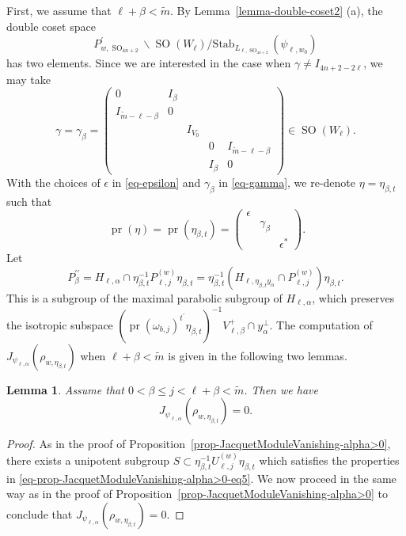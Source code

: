 \documentclass[12pt]{amsart}
\newcommand{\wt}{\widetilde}
\newtheorem{lemma}[theorem]{Lemma}
\theoremstyle{remark}
\newcommand{\pr}{\operatorname{pr}}
\DeclareMathOperator{\SO}{SO}
\begin{document}
First, we assume that $\ell+\beta<\wt m$. By Lemma~\ref{lemma-double-coset2} (a), the double coset space $$P_{w,\SO_{4n+2}}^\prime\backslash \SO(W_{\ell}) / \mathrm{Stab}_{L_{\ell,\SO_{4n+2}}}(\psi_{\ell, w_0})$$ 
has two elements. Since we are interested in the case when $\gamma\not=I_{4n+2-2\ell}$, we may take
\begin{equation}
\label{eq-gamma}
\gamma=\gamma_\beta= \begin{pmatrix}
 0 & I_{\beta} & & &\\
 I_{\wt m -\ell-\beta} & 0 & & &\\
 &&I_{V_0} &&\\
 &&&0&I_{\wt m-\ell-\beta} \\
 &&&I_{\beta} & 0
 \end{pmatrix}\in \SO(W_{\ell}).
\end{equation}
With the choices of $\epsilon$ in \eqref{eq-epsilon} and $\gamma_\beta$ in \eqref{eq-gamma}, we re-denote $\eta=\eta_{\beta, t}$ such that 
\begin{equation*}\
\pr(\eta)=\pr(\eta_{\beta, t})=  \begin{pmatrix}
 \epsilon & & \\ & \gamma_\beta &\\ && \epsilon^*	
 \end{pmatrix}.	
\end{equation*}
Let
\begin{equation}
\label{eq-P-double-prime}
P_{\beta}^{\prime\prime} = H_{\ell,\alpha}\cap \eta_{\beta, t}^{-1} P_{\ell,j}^{(w)}\eta_{\beta,t} = \eta_{\beta, t}^{-1} (H_{\ell, \eta_{\beta, t}y_{\alpha}} \cap P_{\ell,j}^{(w)} ) \eta_{\beta, t}.
\end{equation}
This is a subgroup of the maximal parabolic subgroup of $H_{\ell,\alpha}$, which preserves the isotropic subspace $(\pr(\omega_{b,j})^{t^\prime} \eta_{\beta, t})^{-1} V_{\ell, \beta}^+\cap y_{\alpha}^\perp$. The computation of $J_{\psi_{\ell,\alpha}}(	\rho_{w,\eta_{\beta,t}} )$ when $\ell+\beta<\wt m$ is given in the following two lemmas. 

\begin{lemma}
\label{lemma-JacquetModule-gamma-lemma1}
Assume that $0< \beta\le j < \ell+\beta< \wt m$. 	Then we have
\begin{equation*}
	J_{\psi_{\ell,\alpha}}(	\rho_{w,\eta_{\beta,t}} ) =0.
\end{equation*}
\end{lemma}

\begin{proof}
As in the proof of Proposition~\ref{prop-JacquetModuleVanishing-alpha>0}, there exists a unipotent subgroup $S\subset \eta_{\beta, t}^{-1}U_{\ell,j}^{(w)}\eta_{\beta, t}$ which satisfies the properties in \eqref{eq-prop-JacquetModuleVanishing-alpha>0-eq5}. We now proceed in the same way as in the proof of Proposition~\ref{prop-JacquetModuleVanishing-alpha>0} to conclude that $J_{\psi_{\ell,\alpha}}(	\rho_{w,\eta_{\beta,t}} ) =0$. 
\end{proof}
\end{document}
